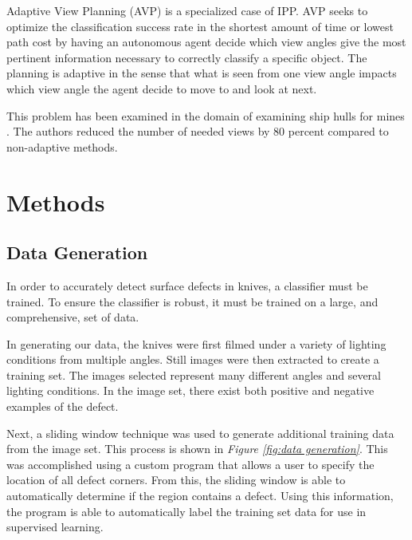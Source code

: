 \documentclass[letterpaper, 10 pt, conference]{ieeeconf}  %
\begin{document}
Adaptive View Planning (AVP) is a specialized case of IPP. AVP seeks to optimize the classification success rate in the shortest amount of time or lowest path cost by having an autonomous agent decide which view angles give the most pertinent information necessary to correctly classify a specific object. The planning is adaptive in the sense that what is seen from one view angle impacts which view angle the agent decide to move to and look at next\cite{hollinger2011active}. 

This problem has been examined in the domain of examining ship hulls for mines \cite{hollinger2011active}. The authors reduced the number of needed views by 80 percent compared to non-adaptive methods.

\section{Methods}

\subsection{Data Generation}

In order to accurately detect surface defects in knives, a classifier must be trained. To ensure the classifier is robust, it must be trained on a large, and comprehensive, set of data.

In generating our data, the knives were first filmed under a variety of lighting conditions from multiple angles. Still images were then extracted to create a training set. The images selected represent many different angles and several lighting conditions. In the image set, there exist both positive and negative examples of the defect.

Next, a sliding window technique was used to generate additional training data from the image set. This process is shown in \textit{Figure \ref{fig:data generation}}. This was accomplished using a custom program that allows a user to specify the location of all defect corners. From this, the sliding window is able to automatically determine if the region contains a defect. Using this information, the program is able to automatically label the training set data for use in supervised learning.
\end{document}
